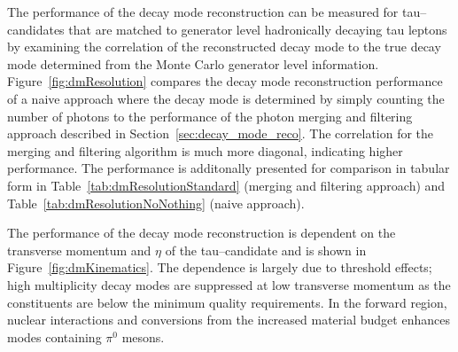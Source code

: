 The performance of the decay mode reconstruction can be measured for
tau--candidates that are matched to generator level hadronically decaying tau
leptons by examining the correlation of the reconstructed decay mode to the true
decay mode determined from the Monte Carlo generator level information.
Figure~\ref{fig:dmResolution} compares the decay mode reconstruction performance
of a naive approach where the decay mode is determined by simply counting the
number of photons to the performance of the photon merging and filtering
approach described in Section~\ref{sec:decay_mode_reco}.  The correlation for
the merging and filtering algorithm is much more diagonal, indicating higher
performance.  The performance is additonally presented for comparison in tabular form in
Table~\ref{tab:dmResolutionStandard} (merging and filtering approach) and
Table~\ref{tab:dmResolutionNoNothing} (naive approach).

The performance of the decay mode reconstruction is dependent on the transverse
momentum and $\eta$ of the tau--candidate and is shown in
Figure~\ref{fig:dmKinematics}.  The \pt dependence is largely due to
threshold effects; high multiplicity decay modes are suppressed at low
transverse momentum as the constituents are below the minimum \pt quality
requirements.  In the forward region, nuclear interactions and conversions from
the increased material budget enhances modes containing $\pi^0$ mesons.




